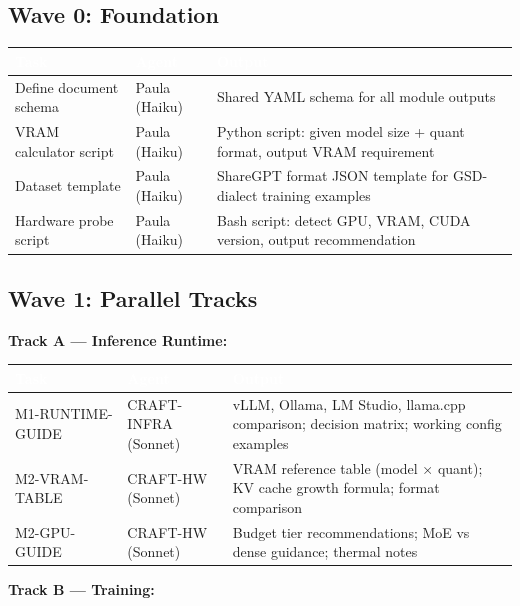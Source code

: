 \documentclass[11pt,letterpaper]{article}
\newcommand{\tableheader}[1]{\textbf{\sffamily\textcolor{white}{#1}}}
\begin{document}
\subsection{Wave 0: Foundation}

\begin{center}
\begin{tabularx}{\textwidth}{L{3cm}L{2cm}X}
\toprule
{}
\tableheader{Task} & \tableheader{Agent} & \tableheader{Output} \\
\midrule
Define document schema & Paula (Haiku) & Shared YAML schema for all module outputs \\
VRAM calculator script & Paula (Haiku) & Python script: given model size + quant format, output VRAM requirement \\
Dataset template & Paula (Haiku) & ShareGPT format JSON template for GSD-dialect training examples \\
Hardware probe script & Paula (Haiku) & Bash script: detect GPU, VRAM, CUDA version, output recommendation \\
\bottomrule
\end{tabularx}
\end{center}

\subsection{Wave 1: Parallel Tracks}

\textbf{Track A --- Inference Runtime:}

\begin{center}
\begin{tabularx}{\textwidth}{L{3cm}L{2cm}X}
\toprule
{}
\tableheader{Task} & \tableheader{Agent} & \tableheader{Output} \\
\midrule
M1-RUNTIME-GUIDE & CRAFT-INFRA (Sonnet) & vLLM, Ollama, LM Studio, llama.cpp comparison; decision matrix; working config examples \\
M2-VRAM-TABLE & CRAFT-HW (Sonnet) & VRAM reference table (model × quant); KV cache growth formula; format comparison \\
M2-GPU-GUIDE & CRAFT-HW (Sonnet) & Budget tier recommendations; MoE vs dense guidance; thermal notes \\
\bottomrule
\end{tabularx}
\end{center}

\textbf{Track B --- Training:}
\end{document}
